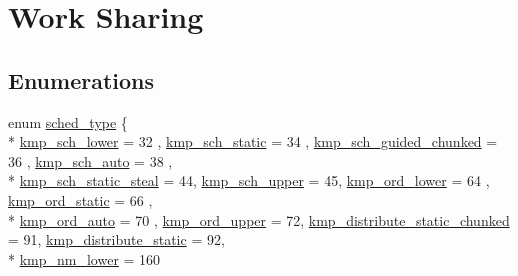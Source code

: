 \hypertarget{group__WORK__SHARING}{\section{Work Sharing}
\label{group__WORK__SHARING}
}
\subsection*{Enumerations}
\begin{DoxyCompactItemize}
\item 
enum \hyperlink{group__WORK__SHARING_gadcaf200537aaa0218a60c398438f81be}{sched\-\_\-type} \{ \\*
\hyperlink{group__WORK__SHARING_ggadcaf200537aaa0218a60c398438f81bea7ed3535e3c97c9c2ce299addd74b4a01}{kmp\-\_\-sch\-\_\-lower} = 32
, \hyperlink{group__WORK__SHARING_ggadcaf200537aaa0218a60c398438f81bea2a987351b9605b918693a17d4dd90772}{kmp\-\_\-sch\-\_\-static} = 34
, \hyperlink{group__WORK__SHARING_ggadcaf200537aaa0218a60c398438f81bea52b66fc7ba82beb3d6fbdb82a6ef045d}{kmp\-\_\-sch\-\_\-guided\-\_\-chunked} = 36
, \hyperlink{group__WORK__SHARING_ggadcaf200537aaa0218a60c398438f81bea270b6b98ec2f9ec4832f7a59b0a0d532}{kmp\-\_\-sch\-\_\-auto} = 38
, \\*
\hyperlink{group__WORK__SHARING_ggadcaf200537aaa0218a60c398438f81beae4b8e84801f56fdb39472c45762bd051}{kmp\-\_\-sch\-\_\-static\-\_\-steal} = 44, 
\hyperlink{group__WORK__SHARING_ggadcaf200537aaa0218a60c398438f81beab1e0332cc09c1f3ee029b9fcc1c40ba0}{kmp\-\_\-sch\-\_\-upper} = 45, 
\hyperlink{group__WORK__SHARING_ggadcaf200537aaa0218a60c398438f81bea9a4a0dce1e919688bcd27411746b7ad8}{kmp\-\_\-ord\-\_\-lower} = 64
, \hyperlink{group__WORK__SHARING_ggadcaf200537aaa0218a60c398438f81beaa0f903270046d7a28b002855648da9f1}{kmp\-\_\-ord\-\_\-static} = 66
, \\*
\hyperlink{group__WORK__SHARING_ggadcaf200537aaa0218a60c398438f81beadb87fc98ffc6440f53caa1f5d6606512}{kmp\-\_\-ord\-\_\-auto} = 70
, \hyperlink{group__WORK__SHARING_ggadcaf200537aaa0218a60c398438f81beabbef146a7c8d44992e9c61bec2309348}{kmp\-\_\-ord\-\_\-upper} = 72, 
\hyperlink{group__WORK__SHARING_ggadcaf200537aaa0218a60c398438f81bea28ae6227a8117b9f39b797caf3211313}{kmp\-\_\-distribute\-\_\-static\-\_\-chunked} = 91, 
\hyperlink{group__WORK__SHARING_ggadcaf200537aaa0218a60c398438f81bea4132f477daf882e74036a9062a97b7a3}{kmp\-\_\-distribute\-\_\-static} = 92, 
\\*
\hyperlink{group__WORK__SHARING_ggadcaf200537aaa0218a60c398438f81beac30b06c765f4623efb929a141ff9457e}{kmp\-\_\-nm\-\_\-lower} = 160

\end{DoxyCompactItemize}
